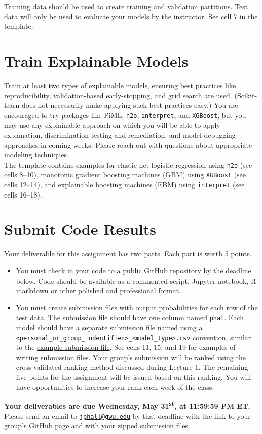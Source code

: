 \documentclass[fleqn]{article}
\begin{document}
\noindent Training data should be used to create training and validation partitions. Test data will only be used to evaluate your models by the instructor. See cell 7 in the template.

\section{Train Explainable Models}

Train at least two types of explainable models, ensuring best practices like reproducibility, validation-based early-stopping, and grid search are used. (Scikit-learn does not necessarily make applying such best practices easy.) You are encouraged to try packages like \href{https://selfexplainml.github.io/PiML-Toolbox/_build/html/index.html}{PiML}, \href{https://docs.h2o.ai/h2o/latest-stable/h2o-docs/downloading.html}{\texttt{h2o}}, \href{https://github.com/interpretml/interpret}{\texttt{interpret}}, and \href{https://xgboost.readthedocs.io/en/latest/install.html}{\texttt{XGBoost}}, but you may use any explainable approach on which you will be able to apply explanation, discrimination testing and remediation, and model debugging approaches in coming weeks. Please reach out with questions about appropriate modeling techniques.\\

\noindent The template contains examples for elastic net logistic regression using \texttt{h2o} (see cells 8--10), monotonic gradient boosting machines (GBM) using \texttt{XGBoost} (see cells 12--14), and explainable boosting machines (EBM) using \texttt{interpret} (see cells 16--18). 

\section{Submit Code Results}

Your deliverable for this assignment has two parts. Each part is worth 5 points. 

\begin{itemize}
	\item You must check in your code to a public GitHub repository by the deadline below. Code should be available as a commented script, Jupyter notebook, R markdown or other polished and professional format. 
	\item You must create submission files with output probabilities for each row of the test data. The submission file should have one column named \texttt{phat}. Each model should have a separate submission file named using a \texttt{<personal\_or\_group\_indentifier>\_<model\_type>.csv} convention, similar to the \href{https://github.com/jphall663/GWU_rml/blob/master/assignments/assignment_1/ph_glm.csv}{example submission file}. See cells 11, 15, and 19 for examples of writing submission files. Your group's submission will be ranked using the cross-validated ranking method discussed during Lecture 1. The remaining five points for the assignment will be issued based on this ranking. You will have opportunities to increase your rank each week of the class. 
\end{itemize}

\noindent \textbf{Your deliverables are due Wednesday, May 31\textsuperscript{st}, at 11:59:59 PM ET.}\\

\noindent Please send an email to \href{mailto:jphall@gwu.edu}{\texttt{jphall@gwu.edu}} by that deadline with the link to your group's GitHub page and with your zipped submission files. 
\end{document}
